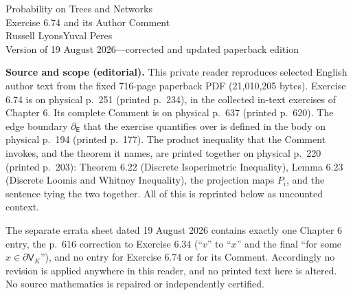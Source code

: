 \documentclass[11pt]{article}
\newcommand{\V}{\mathsf V}
\newcommand{\E}{\mathsf E}
\begin{document}
\begin{center}
{\large Probability on Trees and Networks\\[2pt]Exercise 6.74 and its Author Comment}\\[4pt]
Russell Lyons\quad Yuval Peres\\[2pt]
Version of 19 August 2026---corrected and updated paperback edition
\end{center}

\noindent\textbf{Source and scope (editorial).}
This private reader reproduces selected English author text from the fixed 716-page paperback PDF (21,010,205 bytes). Exercise 6.74 is on physical p.\ 251 (printed p.\ 234), in the collected in-text exercises of Chapter 6. Its complete Comment is on physical p.\ 637 (printed p.\ 620). The edge boundary $\partial_{\E}$ that the exercise quantifies over is defined in the body on physical p.\ 194 (printed p.\ 177). The product inequality that the Comment invokes, and the theorem it names, are printed together on physical p.\ 220 (printed p.\ 203): Theorem 6.22 (Discrete Isoperimetric Inequality), Lemma 6.23 (Discrete Loomis and Whitney Inequality), the projection maps $P_i$, and the sentence tying the two together. All of this is reprinted below as uncounted context.

The separate errata sheet dated 19 August 2026 contains exactly one Chapter 6 entry, the p.\ 616 correction to Exercise 6.34 (``$v$'' to ``$x$'' and the final ``for some $x\in\partial\V_K$''), and no entry for Exercise 6.74 or for its Comment. Accordingly no revision is applied anywhere in this reader, and no printed text here is altered. No source mathematics is repaired or independently certified.
\end{document}
